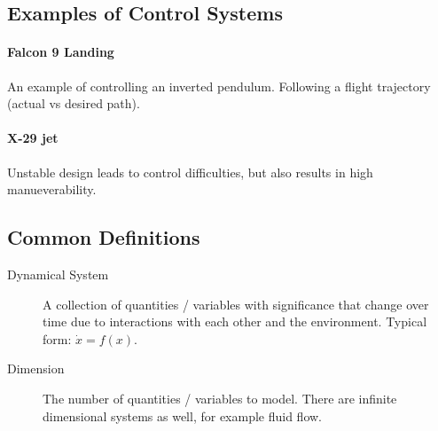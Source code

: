\documentclass[../notes.tex]{subfiles}
\begin{document}
\subsection{Examples of Control Systems}
\paragraph{Falcon 9 Landing}
An example of controlling an inverted pendulum. Following a flight trajectory (actual vs desired path).
\paragraph{X-29 jet}
Unstable design leads to control difficulties, but also results in high manueverability.

\subsection{Common Definitions}
\begin{description}
    \item[Dynamical System] A collection of quantities / variables with significance that change over time due to interactions with each other and the environment. Typical form: $\dot{x} = f(x)$. 
    \item[Dimension] The number of quantities / variables to model. There are infinite dimensional systems as well, for example fluid flow. 
\end{description}
\end{document}
